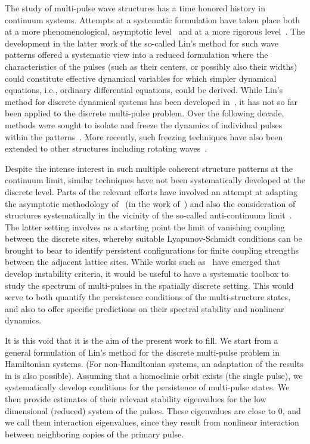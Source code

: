 \documentclass[12pt]{elsarticle}
\begin{document}
The study of multi-pulse wave structures has a time
honored history in continuum systems. Attempts at
a systematic formulation have taken place both at
a more phenomenological, asymptotic level~\cite{elphick}
and at a more rigorous level~\cite{Sandstede1998}.
The development in the latter work of the so-called
Lin's method for such wave patterns offered a 
systematic view into a reduced formulation where
the characteristics of the pulses (such as their centers,
or possibly also their widths) could constitute effective
dynamical variables for which simpler dynamical equations,
i.e., ordinary differential equations, could be derived. While Lin's method for discrete dynamical systems has been developed in~\cite{Knobloch2000}, it has not so far been applied to the discrete multi-pulse problem.
Over the following decade, methods were sought to 
isolate and freeze the dynamics of individual pulses
within the patterns~\cite{beyn1,beyn2}. More recently,
such freezing techniques have also been extended to other
structures including rotating waves~\cite{beyn3}. 

Despite the intense interest in such multiple coherent
structure patterns at the continuum limit, similar 
techniques have not been systematically developed
at the discrete level. Parts of the relevant efforts
have involved an attempt at adapting the
asymptotic methodology of~\cite{elphick} 
(in the work of~\cite{kevold}) and also the consideration
of structures systematically in the vicinity of the
so-called anti-continuum limit~\cite{Pelinovsky2005}.
The latter setting involves as a starting point the
limit of vanishing coupling between the discrete sites,
whereby suitable Lyapunov-Schmidt conditions can 
be brought to bear to identify persistent configurations
for finite coupling strengths between the adjacent
lattice sites. While works such as~\cite{Kapitula2001a}
have emerged that develop instability criteria, it would
be useful to have a systematic toolbox to study the spectrum of multi-pulses in the spatially discrete setting. This would
serve to both quantify the persistence conditions of
the multi-structure states, and also to offer specific
predictions on their spectral stability and nonlinear
dynamics. 

It is this void that it is the aim of the present work
to fill. We start from a general formulation of Lin's method
for the discrete multi-pulse problem in Hamiltonian systems. (For non-Hamiltonian systems, an adaptation of the results in \cite{Sandstede1998} is also possible). Assuming that a homoclinic orbit exists (the single pulse), we systematically develop conditions for the persistence of multi-pulse states. We then provide estimates of their relevant stability eigenvalues for the low dimensional (reduced) system of the pulses. These eigenvalues are close to 0, and we call them interaction eigenvalues, since they result from nonlinear interaction between neighboring copies of the primary pulse.
\end{document}
